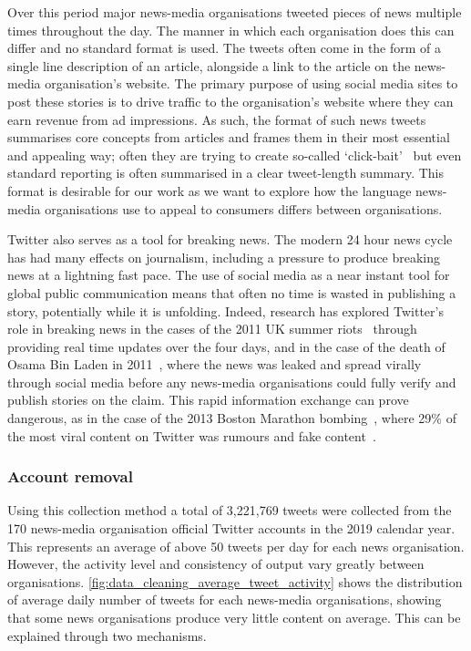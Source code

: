 Over this period major news-media organisations tweeted pieces of news multiple times throughout the day. The manner in which each organisation does this can differ and no standard format is used. The tweets often come in the form of a single line description of an article, alongside a link to the article on the news-media organisation's website. The primary purpose of using social media sites to post these stories is to drive traffic to the organisation's website where they can earn revenue from ad impressions. As such, the format of such news tweets summarises core concepts from articles and frames them in their most essential and appealing way; often they are trying to create so-called `click-bait'~\cite{potthastCrowdsourcingLargeCorpus2018} but even standard reporting is often summarised in a clear tweet-length summary. This format is desirable for our work as we want to explore how the language news-media organisations use to appeal to consumers differs between organisations.

Twitter also serves as a tool for breaking news. The modern 24 hour news cycle has had many effects on journalism, including a pressure to produce breaking news at a lightning fast pace. The use of social media as a near instant tool for global public communication means that often no time is wasted in publishing a story, potentially while it is unfolding. Indeed, research has explored Twitter's role in breaking news in the cases of the 2011 UK summer riots~\cite{vis_Twitter_2013} through providing real time updates over the four days, and in the case of the death of Osama Bin Laden in 2011~\cite{hu_breaking_2012}, where the news was leaked and spread virally through social media before any news-media organisations could fully verify and publish stories on the claim. %
This rapid information exchange can prove dangerous, as in the case of the 2013 Boston Marathon bombing~\cite{starbird_rumors_2014}, where 29\% of the most viral content on Twitter was rumours and fake content~\cite{gupta_100_2013}.

\subsubsection{Account removal}
Using this collection method a total of 3,221,769 tweets were collected from the 170 news-media organisation official Twitter accounts in the 2019 calendar year. This represents an average of above 50 tweets per day for each news organisation. However, the activity level and consistency of output vary greatly between organisations. \autoref{fig:data_cleaning_average_tweet_activity} shows the distribution of average daily number of tweets for each news-media organisations, showing that some news organisations produce very little content on average. This can be explained through two mechanisms.

